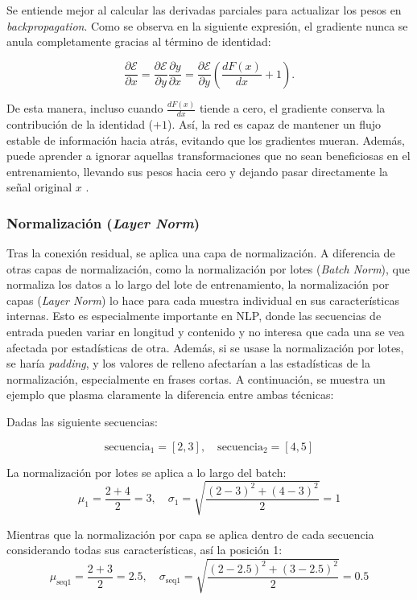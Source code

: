\documentclass[11pt]{book}
\begin{document}
Se entiende mejor al calcular las derivadas parciales para actualizar los pesos en \textit{backpropagation}. Como se observa en la siguiente expresión, el gradiente nunca se anula completamente gracias al término de identidad: 

\[
\frac{\partial \mathcal{E}}{\partial x}
= \frac{\partial \mathcal{E}}{\partial y}
    \frac{\partial y}{\partial x}
= \frac{\partial \mathcal{E}}{\partial y}
    \left( \frac{dF(x)}{dx} + 1 \right).
\]

De esta manera, incluso cuando $\frac{dF(x)}{dx}$ tiende a cero, el gradiente conserva la contribución de la identidad ($+1$). Así, la red es capaz de mantener un flujo estable de información hacia atrás, evitando que los gradientes mueran. Además, puede aprender a ignorar aquellas transformaciones que no sean beneficiosas en el entrenamiento, llevando sus pesos hacia cero y dejando pasar directamente la señal original $x$ \parencite{apxml_addnorm}. 

\subsubsection{Normalización (\textit{Layer Norm})}

Tras la conexión residual, se aplica una capa de normalización. A diferencia de otras capas de normalización, como la normalización por lotes (\textit{Batch Norm}), que normaliza los datos a lo largo del lote de entrenamiento, la normalización por capas (\textit{Layer Norm}) lo hace para cada muestra individual en sus características internas. Esto es especialmente importante en NLP, donde las secuencias de entrada pueden variar en longitud y contenido y no interesa que cada una se vea afectada por estadísticas de otra. Además, si se usase la normalización por lotes, se haría \textit{padding}, y los valores de relleno afectarían a las estadísticas de la normalización, especialmente en frases cortas. A continuación, se muestra un ejemplo que plasma claramente la diferencia entre ambas técnicas:

Dadas las siguiente secuencias: 

\[
\text{secuencia}_1 = [2,3], \quad \text{secuencia}_2 = [4,5]
\]

La normalización por lotes se aplica a lo largo del batch:
\[
\mu_1 = \frac{2 + 4}{2} = 3, 
\quad 
\sigma_1 = \sqrt{\frac{(2-3)^2 + (4-3)^2}{2}} = 1
\]

Mientras que la normalización por capa se aplica dentro de cada secuencia considerando todas sus características, así la posición 1:
\[
\mu_{\text{seq1}} = \frac{2 + 3}{2} = 2.5, 
\quad 
\sigma_{\text{seq1}} = \sqrt{\frac{(2-2.5)^2 + (3-2.5)^2}{2}} = 0.5
\]
\end{document}
